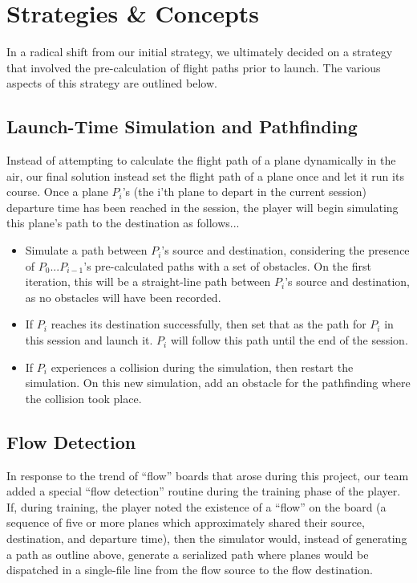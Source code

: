 \documentclass[10pt]{article}
\begin{document}
\newpage
\section{Strategies \& Concepts}
In a radical shift from our initial strategy, we ultimately decided on a strategy that involved
the pre-calculation of flight paths prior to launch. The various aspects of this strategy are 
outlined below.

\subsection{Launch-Time Simulation and Pathfinding}
Instead of attempting to calculate the flight path of a plane dynamically in the air, our final
solution instead set the flight path of a plane once and let it run its course. Once a plane $P_i$'s 
(the i'th plane to depart in the current session)  departure time has been reached in the session, 
the player will begin simulating this plane's path to the destination as follows...
\begin{itemize}
  \item Simulate a path between $P_i$'s source and destination, considering the presence of 
    $P_0$...$P_{i-1}$'s pre-calculated paths with a set of obstacles. On the first iteration, 
    this will be a straight-line path between $P_i$'s source and destination, as no obstacles
    will have been recorded.
  \item If $P_i$ reaches its destination successfully, then set that as the path for $P_i$ in this
    session and launch it. $P_i$ will follow this path until the end of the session.
  \item If $P_i$ experiences a collision during the simulation, then restart the simulation. On this new
    simulation, add an obstacle for the pathfinding where the collision took place.
\end{itemize}

\subsection{Flow Detection}
In response to the trend of ``flow'' boards that arose during this project, our team added a special
``flow detection'' routine during the training phase of the player. If, during training, the player noted
the existence of a ``flow'' on the board (a sequence of five or more planes which approximately shared 
their source, destination, and departure time), then the simulator would, instead of generating a path
as outline above, generate a serialized path where planes would be dispatched in a single-file line
from the flow source to the flow destination.
\end{document}
